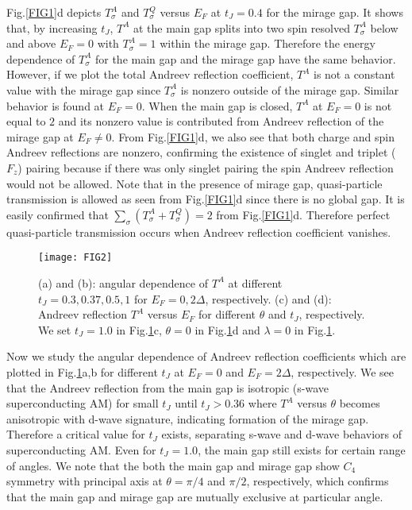 \documentclass[aps, prb, twocolumn, amssymb, amsmath, showpacs, superscriptaddress]{revtex4-1}
\begin{document}
Fig.\ref{FIG1}d depicts $T^A_\sigma$ and $T^Q_\sigma$ versus $E_F$ at $t_J=0.4$ for the mirage gap. It shows that, by increasing $t_J$, $T^A$ at the main gap splits into two spin resolved $T^A_\sigma$ below and above $E_F=0$ with $T^A_\sigma=1$ within the mirage gap. Therefore the energy dependence of $T^A_\sigma$ for the main gap and the mirage gap have the same behavior.
However, if we plot the total Andreev reflection coefficient, $T^A$ is not a constant value with the mirage gap since $T^A_\sigma$ is nonzero outside of the mirage gap. Similar behavior is found at $E_F=0$. When the main gap is closed, $T^A$ at $E_F=0$ is not equal to $2$ and its nonzero value is contributed from Andreev reflection of the mirage gap at $E_F \ne 0$.
From Fig.\ref{FIG1}d, we also see that both charge and spin Andreev reflections are nonzero, confirming the existence of singlet and triplet ($F_z$) pairing because if there was only singlet pairing the spin Andreev reflection would not be allowed.
Note that in the presence of mirage gap, quasi-particle transmission is allowed as seen from Fig.\ref{FIG1}d since there is no global gap. It is easily confirmed that $\sum_\sigma (T^A_\sigma + T^Q_\sigma)=2$ from Fig.\ref{FIG1}d. Therefore perfect quasi-particle transmission occurs when Andreev reflection coefficient vanishes.
\begin{figure}[ht!]
\centering
\texttt{[image: FIG2]}
\caption{
\label{FIG2}
(a) and (b): angular dependence of $T^A$ at different $t_J=0.3, 0.37, 0.5, 1$ for $E_F=0, 2\Delta$, respectively.
(c) and (d): Andreev reflection $T^A$ versus $E_F$ for different $\theta$ and $t_J$, respectively. We set $t_J=1.0$ in Fig.\ref{FIG2}c, $\theta=0$ in Fig.\ref{FIG2}d and $\lambda=0$ in Fig.\ref{FIG2}.
}
\end{figure}

Now we study the angular dependence of Andreev reflection coefficients which are plotted in Fig.\ref{FIG2}a,b for different $t_J$ at $E_F=0$ and $E_F=2\Delta$, respectively. We see that the Andreev reflection from the main gap is isotropic (s-wave superconducting AM) for small $t_J$ until $t_J > 0.36$ where $T^A$ versus $\theta$ becomes anisotropic with d-wave signature, indicating formation of the mirage gap. Therefore a critical value for $t_J$ exists, separating s-wave and d-wave behaviors of superconducting AM.
Even for $t_J=1.0$, the main gap still exists for certain range of angles. We note that the both the main gap and mirage gap show $C_4$ symmetry with principal axis at $\theta=\pi/4$ and $\pi/2$, respectively, which confirms that the main gap and mirage gap are mutually exclusive at particular angle.
\end{document}
